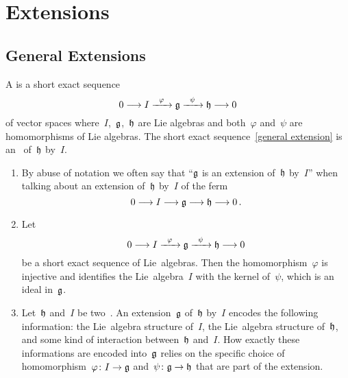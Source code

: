 \chapter{Extensions}








\section{General Extensions}

\begin{definition}
  A  is a short exact sequence
  \begin{equation}
    \label{general extension}
    0 
    \to
    I
    \xto{\varphi}
    \glie
    \xto{\psi}
    \hlie
    \to
    0
  \end{equation}
  of vector spaces where~$I$,~$\mathfrak{g}$,~$\mathfrak{h}$ are Lie algebras and both~$\varphi$ and~$\psi$ are homomorphisms of Lie algebras.
  The short exact sequence~\eqref{general extension} is an~ of~$\mathfrak{h}$ by~$I$.
\end{definition}


\begin{remark}
  \leavevmode
  \begin{enumerate}
    \item
      By abuse of notation we often say that \enquote{$\mathfrak{g}$ is an extension of~$\mathfrak{h}$ by~$I$} when talking about an extension
      of~$\mathfrak{h}$ by~$I$ of the ferm
      \[
        0 
        \to
        I
        \to
        \glie
        \to
        \hlie
        \to
        0 \,.
      \]
    \item
      Let
      \[
        0
        \to
        I
        \xto{\varphi}
        \glie
        \xto{\psi}
        \hlie
        \to
        0
      \]
      be a short exact sequence of Lie~algebras.
      Then the homomorphism~$\varphi$ is injective and identifies the Lie~algebra~$I$ with the kernel of~$\psi$, which is an ideal in~$\mathfrak{g}$.
    \item
      Let~$\mathfrak{h}$ and~$I$ be two~\liealgebra{$\kf$}.
      An extension~$\mathfrak{g}$ of~$\mathfrak{h}$ by~$I$ encodes the following information:
      the Lie~algebra structure of~$I$, the Lie~algebra structure of~$\mathfrak{h}$, and some kind of interaction between~$\mathfrak{h}$ and~$I$.
      How exactly these informations are encoded into~$\mathfrak{g}$ relies on the specific choice of homomorphism~$\varphi \colon I \to \glie$ and~$\psi \colon \glie \to \hlie$ that are part of the extension.
  \end{enumerate}
\end{remark}


